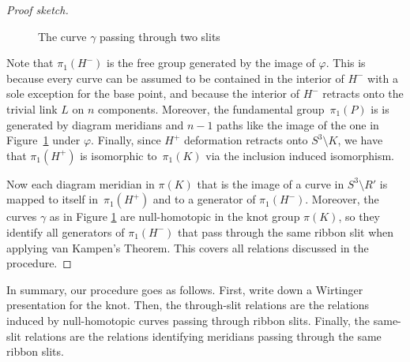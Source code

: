 \documentclass{article}
\theoremstyle{definition}
\begin{document}
\begin{proof}[Proof sketch]
\begin{figure}[htb]
\centering
{}
\caption{The curve $\gamma$ passing through two slits}
\label{fig:an-interesting-curve}
\end{figure}

Note that $\pi_1(H^-)$ is the free group generated by the image of $\varphi$. This is because every curve can be assumed to be contained in the interior of $H^-$ with a sole exception for the base point, and because the interior of $H^-$ retracts onto the trivial link $L$ on $n$ components. Moreover, the fundamental group~$\pi_1(P)$ is is generated by diagram meridians and $n-1$ paths like the image of the one in Figure~\ref{fig:an-interesting-curve} under $\varphi$. Finally, since $H^+$ deformation retracts onto $S^3 \setminus K$, we have that $\pi_1(H^+)$ is isomorphic to~$\pi_1(K)$ via the inclusion induced isomorphism.

Now each diagram meridian in $\pi(K)$ that is the image of a curve in $S^3 \setminus R'$ is mapped to itself in~$\pi_1(H^+)$ and to a generator of $\pi_1(H^-)$. Moreover, the curves $\gamma$ as in Figure \ref{fig:an-interesting-curve} are null-homotopic in the knot group $\pi(K)$, so they identify all generators of $\pi_1(H^-)$ that pass through the same ribbon slit when applying van Kampen's Theorem. This covers all relations discussed in the procedure.
\end{proof}

In summary, our procedure goes as follows. First, write down a Wirtinger presentation for the knot. Then, the through-slit relations are the relations induced by null-homotopic curves passing through ribbon slits. Finally, the same-slit relations are the relations identifying meridians passing through the same ribbon slits.
\end{document}
